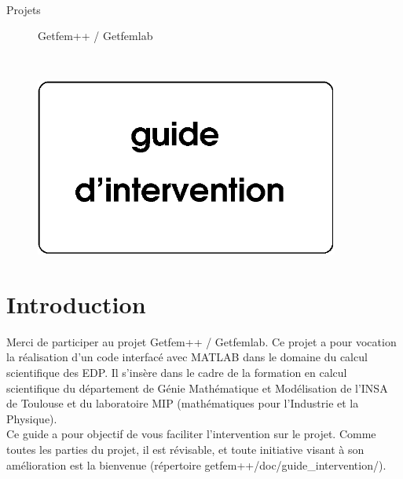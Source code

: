 \documentclass[12pt,a4paper]{../doc}
\begin{document}
$\;$\\[3cm]\thispagestyle{empty}

{\begin{center} \Huge Projets \\[1cm]

\begin{figure}[H]
\begin{center}
  { \sc Getfem++  / Getfemlab }
\end{center}
\end{figure}
$\;$\\[1cm]

\begin{figure}[H]
\begin{center}
\includegraphics[width=10cm,angle=0]{guide_intervention_pg.eps}
\end{center}
\end{figure}
\end{center}
 \newpage

\tableofcontents


\section{Introduction}
  Merci de participer au projet {\sc Getfem++ / Getfemlab}. Ce projet a pour vocation la r\'ealisation d'un code interfac\'e avec MATLAB dans le domaine du calcul scientifique des EDP. Il s'ins\`ere dans le cadre de la formation en calcul scientifique du d\'epartement de G\'enie Math\'ematique et Mod\'elisation de l'INSA de Toulouse et du laboratoire MIP (math\'ematiques pour l'Industrie et la Physique).\\[0.4cm]
Ce guide a pour objectif de vous faciliter l'intervention sur le projet. Comme toutes les parties du projet, il est r\'evisable, et toute initiative visant \`a son am\'elioration est la bienvenue (r\'epertoire getfem++/doc/guide\_intervention/).

\newpage

}
\end{document}
